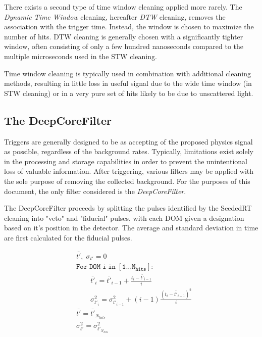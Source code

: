 There exists a second type of time window cleaning applied more rarely.
The \emph{Dynamic Time Window} cleaning, hereafter \emph{DTW} cleaning, removes the association with the trigger time. 
Instead, the window is chosen to maximize the number of hits.
DTW cleaning is generally chosen with a significantly tighter window, often consisting of only a few hundred nanoseconds compared to the multiple microseconds used in the STW cleaning.

Time window cleaning is typically used in combination with additional cleaning methods, resulting in little loss in useful signal due to the wide time window (in STW cleaning) or in a very pure set of hits likely to be due to unscattered light.


\subsection{The DeepCoreFilter}
Triggers are generally designed to be as accepting of the proposed physics signal as possible, regardless of the background rates.
Typically, limitations exist solely in the processing and storage capabilities in order to prevent the unintentional loss of valuable information.
After triggering, various filters may be applied with the sole purpose of removing the collected background.
For the purposes of this document, the only filter considered is the \emph{DeepCoreFilter}.

The DeepCoreFilter proceeds by splitting the pulses identified by the SeededRT cleaning into "veto" and "fiducial" pulses, with each DOM given a designation based on it's position in the detector.
The average and standard deviation in time are first calculated for the fiducial pulses.

\begin{equation}
\begin{split}
	&\bar{t'},\; \sigma_{t'} = 0\\
	&\mathtt{For\; DOM\; i\; in\; [1...N_{hits}]:}\\
	&\qquad	\bar{t'}_i = \bar{t'}_{i-1} + \frac{t_i - \bar{t'}_{i-1}}{i}\\
	&\qquad	\sigma_{t'_i}^2 = \sigma_{t'_{i-1}}^2 + (i-1) \frac{\left(t_i - \bar{t'}_{i-1}\right)^2}{i}\\
	&\bar{t'} = \bar{t'}_{N_{hits}}\\
	&\sigma_{t'}^2 = \sigma_{t'_{N_{hits}}}^2
\end{split}
\end{equation}

